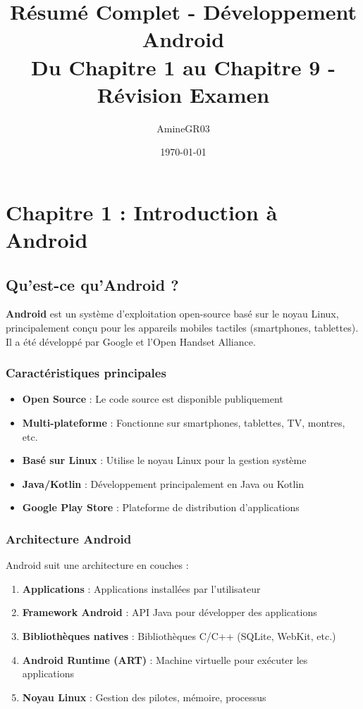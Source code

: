\documentclass[11pt,a4paper]{article}
\title{Résumé Complet - Développement Android\\
\large Du Chapitre 1 au Chapitre 9 - Révision Examen}
\author{AmineGR03}
\date{\today}
\begin{document}
\maketitle

\tableofcontents
\newpage


\section{Chapitre 1 : Introduction à Android}

\subsection{Qu'est-ce qu'Android ?}

\textbf{Android} est un système d'exploitation open-source basé sur le noyau Linux, principalement conçu pour les appareils mobiles tactiles (smartphones, tablettes). Il a été développé par Google et l'Open Handset Alliance.

\subsubsection{Caractéristiques principales}

\begin{itemize}
    \item \textbf{Open Source} : Le code source est disponible publiquement
    \item \textbf{Multi-plateforme} : Fonctionne sur smartphones, tablettes, TV, montres, etc.
    \item \textbf{Basé sur Linux} : Utilise le noyau Linux pour la gestion système
    \item \textbf{Java/Kotlin} : Développement principalement en Java ou Kotlin
    \item \textbf{Google Play Store} : Plateforme de distribution d'applications
\end{itemize}

\subsubsection{Architecture Android}

Android suit une architecture en couches :

\begin{enumerate}
    \item \textbf{Applications} : Applications installées par l'utilisateur
    \item \textbf{Framework Android} : API Java pour développer des applications
    \item \textbf{Bibliothèques natives} : Bibliothèques C/C++ (SQLite, WebKit, etc.)
    \item \textbf{Android Runtime (ART)} : Machine virtuelle pour exécuter les applications
    \item \textbf{Noyau Linux} : Gestion des pilotes, mémoire, processus
\end{enumerate}
\end{document}
